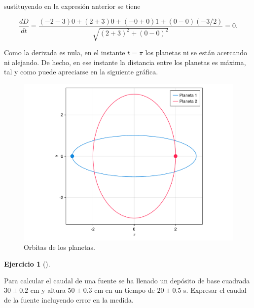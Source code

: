 \documentclass[
  a4paper,
]{scrreport}
\theoremstyle{definition}
\newtheorem{exercise}{Ejercicio}[chapter]
\theoremstyle{remark}
\begin{document}
\begin{tcolorbox}
sustituyendo en la expresión anterior se tiene

\[
\frac{dD}{dt} 
= \frac{(-2-3)0 + (2+3)0 + (-0+0)1 + (0-0)(-3/2)}{\sqrt{(2+3)^2 + (0-0)^2}}
= 0.
\]

Como la derivada es nula, en el instante \(t=\pi\) los planetas ni se
están acercando ni alejando. De hecho, en ese instante la distancia
entre los planetas es máxima, tal y como puede apreciarse en la
siguiente gráfica.

\begin{figure}[H]

{\centering \includegraphics{img/derivadas-funciones-varias-variables/planetas.pdf}

}

\caption{Orbitas de los planetas.}

\end{figure}%

\end{tcolorbox}

\begin{exercise}[]\protect\hypertarget{exr-transmision-errores-caudal-fuente}{}\label{exr-transmision-errores-caudal-fuente}

Para calcular el caudal de una fuente se ha llenado un depósito de base
cuadrada \(30\pm 0.2\) cm y altura \(50\pm 0.3\) cm en un tiempo de
\(20\pm 0.5\) s. Expresar el caudal de la fuente incluyendo error en la
medida.

\end{exercise}
\end{document}
